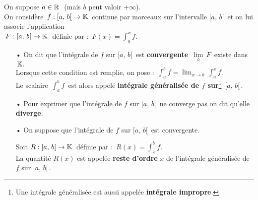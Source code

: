 On suppose \(a\in\mathbb{R}\ \) (mais $b$ peut valoir \(+\infty\)).\vspace{0.2cm}\\
On considère \(\,f:[a,\,b[\;\to\mathbb{K}\,\) continue par morceaux sur l'intervalle \([a,\,b[\,\) et on lui associe l'application\vspace{0.1cm}\\
\(\,F:[a,\,b[\;\to\mathbb{K}\;\) définie par : \(\,\displaystyle F(x)=\int_{a}^{x}f\).
\begin{itemize}[leftmargin=0.5cm]
    \item[•] On dit que l'intégrale de $f$ sur \([a,\,b[\,\) est \textbf{convergente} \ssi \(\,\underset{b}{\lim}\,F\,\) existe dans \(\,\mathbb{K}.\)\\
    Lorsque cette condition est remplie, on pose : \(\,\displaystyle \int_{a}^{b}\!f=\lim_{x\to b}\,\int_{a}^{x}\!f\).\\
    Le scalaire \(\,\displaystyle \int_{a}^{b}\!f\,\) est alors appelé \textbf{intégrale généralisée de $f$ sur}\footnote{Une intégrale généralisée est aussi appelée \textbf{intégrale impropre}.} \(\,[a,\,b[\,.\)\vspace{0.2cm}

    \item[•] Pour exprimer que l'intégrale de $f$ sur \([a,\,b[\,\) ne converge pas on dit qu'elle \textbf{diverge}.\vspace{0.4cm}
    
    \item[•] On suppose que l'intégrale de $f$ sur \([a,\,b[\,\) est convergente.\vspace{-0.2cm}
    
    \hspace{4cm}Soit \(R:[a,\,b[\;\to\mathbb{K}\,\) définie par : \(\,\displaystyle R(x)=\int_{x}^{b}\!f\).\vspace{0.1cm}\\
    La quantité \(R(x)\) est appelée \textbf{reste d'ordre} $x$ de l'intégrale généralisée de $f$ sur \([a,\,b[\,\).
\end{itemize}

\vspace{2cm}

